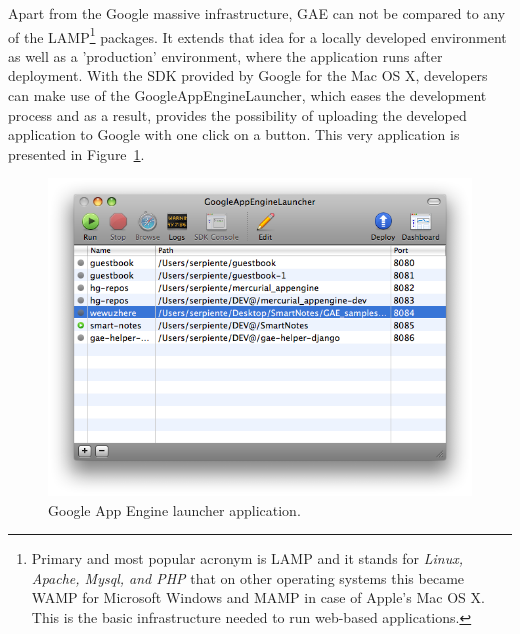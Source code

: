 Apart from the Google massive infrastructure, GAE can not be compared to any of the LAMP\footnote{Primary and most popular acronym is LAMP and it stands for \textit{Linux, Apache, Mysql, and PHP} that on other operating systems this became WAMP for Microsoft Windows and MAMP in case of Apple's Mac OS X. This is the basic infrastructure needed to run web-based applications.} packages. It extends that idea for a locally developed environment as well as a 'production' environment, where the application runs after deployment. With the SDK provided by Google for the Mac OS X, developers can make use of the GoogleAppEngineLauncher, which eases the development process and as a result, provides the possibility of uploading the developed application to Google with one click on a button. This very application is presented in Figure~\ref{gae_launcher}.
\begin{figure}[h]
\begin{center}
\includegraphics[scale=0.4]{img/gae_launcher.png}
\caption{Google App Engine launcher application.}
\label{gae_launcher}
\end{center}
\end{figure}

